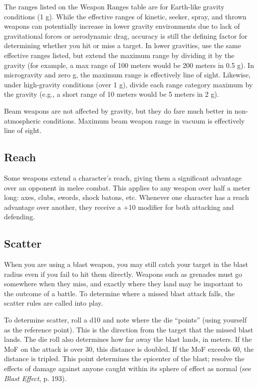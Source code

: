 The ranges listed on the Weapon Ranges table are for Earth-like gravity conditions (1 g). While the effective ranges of kinetic, seeker, spray, and thrown weapons can potentially increase in lower gravity environments due to lack of gravitational forces or aerodynamic drag, accuracy is still the defining factor for determining whether you hit or miss a target. In lower gravities, use the same effective ranges listed, but extend the maximum range by dividing it by the gravity (for example, a max range of 100 meters would be 200 meters in 0.5 g). In microgravity and zero g, the maximum range is effectively line of sight. Likewise, under high-gravity conditions (over 1 g), divide each range category maximum by the gravity (e.g., a short range of 10 meters would be 5 meters in 2 g).

Beam weapons are not affected by gravity, but they do fare much better in non-atmospheric conditions. Maximum beam weapon range in vacuum is effectively line of sight.


\subsection{Reach}
\label{sec:reach}

Some weapons extend a character’s reach, giving them a significant advantage over an opponent in melee combat. This applies to any weapon over half a meter long: axes, clubs, swords, shock batons, etc. Whenever one character has a reach advantage over another, they receive a +10 modifier for both attacking and defending.


\subsection{Scatter}
\label{sec:scatter}

When you are using a blast weapon, you may still catch your target in the blast radius even if you fail to hit them directly. Weapons such as grenades must go somewhere when they miss, and exactly where they land may be important to the outcome of a battle. To determine where a missed blast attack falls, the scatter rules are called into play.

To determine scatter, roll a d10 and note where the die ``points'' (using yourself as the reference point). This is the direction from the target that the missed blast lands. The die roll also determines how far away the blast lands, in meters. If the MoF on the attack is over 30, this distance is doubled. If the MoF exceeds 60, the distance is tripled. This point determines the epicenter of the blast; resolve the effects of damage against anyone caught within its sphere of effect as normal (see \emph{Blast Effect}, p. 193).


